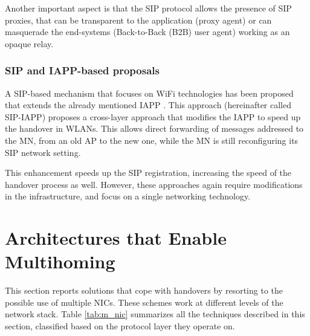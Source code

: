 \documentclass[preprint,12pt]{elsarticle}
\begin{document}
Another important aspect is that the SIP protocol allows the presence of SIP 
proxies, that can be transparent to the application (proxy agent) or can 
masquerade the end-systems (Back-to-Back (B2B) user agent) working as an opaque 
relay.

\subsubsection{SIP and IAPP-based proposals}
A SIP-based mechanism that focuses on WiFi technologies has been proposed that 
extends the already mentioned IAPP \cite{WuYH07}. 
This approach (hereinafter called SIP-IAPP) proposes a cross-layer approach that modifies the IAPP to speed up the handover in WLANs. This allows direct forwarding of messages addressed to the MN, from an old AP to the new one, while the MN is still reconfiguring its SIP network setting.

This enhancement speeds up the SIP registration, increasing the speed of the handover process as well. However, these approaches again require modifications in the infrastructure, and focus on a single networking technology.


\section{Architectures that Enable Multihoming}
\label{sec:multihoming}

This section reports solutions that cope with handovers by resorting to the 
possible use of multiple NICs. These schemes work at different levels of the 
network stack.
Table \ref{tab:m_nic} summarizes all the techniques described in this section, classified based 
on the protocol layer they operate on.
\end{document}
